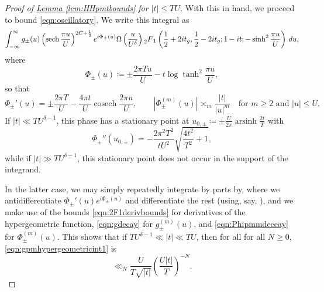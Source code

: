 \documentclass[11pt,a4paper]{amsart}
\DeclareMathOperator{\arsinh}{arsinh}
\DeclareMathOperator{\cosech}{cosech}
\DeclareMathOperator{\sech}{sech}
\numberwithin{equation}{section}
\theoremstyle{remark}
\theoremstyle{definition}
\begin{document}
\begin{proof}[Proof of {\hyperref[lem:HHpmtbounds]{Lemma \ref*{lem:HHpmtbounds}}} for $|t| \leq TU$]
With this in hand, we proceed to bound \eqref{eqn:oscillatory}. We write this integral as
\begin{equation}
\label{eqn:gpmhypergeometricint1}
\int_{-\infty}^{\infty} g_{\pm}(u) \left(\sech \frac{\pi u}{U}\right)^{2C + \frac{1}{2}} e^{i\Phi_{\pm}(u)} \Omega\left(\frac{u}{U^{\delta}}\right) \prescript{}{2}{F}_1\left(\frac{1}{2} + 2it_g,\frac{1}{2} - 2it_g;1 - it; -\sinh^2 \frac{\pi u}{U}\right) \, du,
\end{equation}
where
\[\Phi_{\pm}(u) \coloneqq \pm \frac{2\pi Tu}{U} - t \log \tanh^2 \frac{\pi u}{U},\]
so that
\begin{equation}
\label{eqn:Phipmmdeceay}
\Phi_{\pm}'(u) = \pm \frac{2\pi T}{U} - \frac{4\pi t}{U} \cosech \frac{2\pi u}{U}, \qquad \left|\Phi_{\pm}^{(m)}(u)\right| \asymp_m \frac{|t|}{|u|^m} \quad \text{for $m \geq 2$ and $|u| \leq U$.}
\end{equation}
If $|t| \ll TU^{\delta - 1}$, this phase has a stationary point at $u_{0,\pm} \coloneqq \pm \frac{U}{2\pi} \arsinh \frac{2t}{T}$ with
\[\Phi_{\pm}''(u_{0,\pm}) = -\frac{2\pi^2 T^2}{tU^2} \sqrt{\frac{4t^2}{T^2} + 1},\]
while if $|t| \gg TU^{\delta - 1}$, this stationary point does not occur in the support of the integrand.

In the latter case, we may simply repeatedly integrate by parts by, where we antidifferentiate $\Phi_{\pm}'(u) e^{i\Phi_{\pm}(u)}$ and differentiate the rest (using, say, \cite[Lemma 3.1 (1)]{KPY19}), and we make use of the bounds \eqref{eqn:2F1derivbounds} for derivatives of the hypergeometric function, \eqref{eqn:gdecay} for $g_{\pm}^{(m)}(u)$, and \eqref{eqn:Phipmmdeceay} for $\Phi_{\pm}^{(m)}(u)$. This shows that if $TU^{\delta - 1} \ll |t| \ll TU$, then for all for all $N \geq 0$, \eqref{eqn:gpmhypergeometricint1} is
\[\ll_N \frac{U}{T\sqrt{|t|}} \left(\frac{U|t|}{T}\right)^{-N}.\]


\end{proof}
\end{document}
